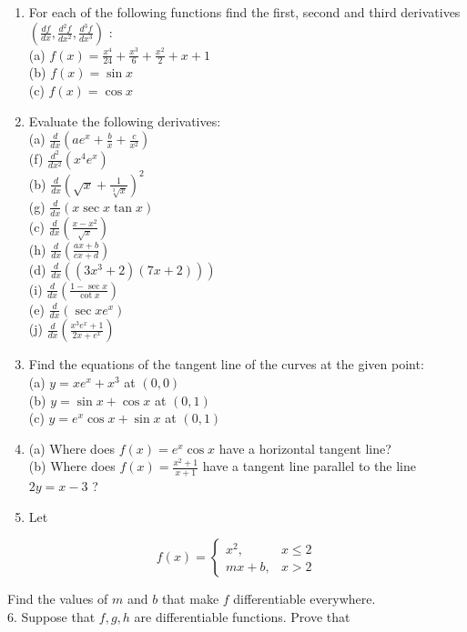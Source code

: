 \documentclass[10pt]{article}
\begin{document}
\begin{enumerate}
  \item For each of the following functions find the first, second and third derivatives $\left(\frac{d f}{d x}, \frac{d^{2} f}{d x^{2}}, \frac{d^{3} f}{d x^{3}}\right)$ :\\
(a) $f(x)=\frac{x^{4}}{24}+\frac{x^{3}}{6}+\frac{x^{2}}{2}+x+1$\\
(b) $f(x)=\sin x$\\
(c) $f(x)=\cos x$
  \item Evaluate the following derivatives:\\
(a) $\frac{d}{d x}\left(a e^{x}+\frac{b}{x}+\frac{c}{x^{2}}\right)$\\
(f) $\frac{d^{2}}{d x^{2}}\left(x^{4} e^{x}\right)$\\
(b) $\frac{d}{d x}\left(\sqrt{x}+\frac{1}{\sqrt[3]{x}}\right)^{2}$\\
(g) $\frac{d}{d x}(x \sec x \tan x)$\\
(c) $\frac{d}{d x}\left(\frac{x-x^{2}}{\sqrt{x}}\right)$\\
(h) $\frac{d}{d x}\left(\frac{a x+b}{c x+d}\right)$\\
(d) $\left.\frac{d}{d x}\left(\left(3 x^{3}+2\right)(7 x+2)\right)\right)$\\
(i) $\frac{d}{d x}\left(\frac{1-\sec x}{\cot x}\right)$\\
(e) $\frac{d}{d x}\left(\sec x e^{x}\right)$\\
(j) $\frac{d}{d x}\left(\frac{x^{3} e^{x}+1}{2 x+e^{x}}\right)$
  \item Find the equations of the tangent line of the curves at the given point:\\
(a) $y=x e^{x}+x^{3}$ at $(0,0)$\\
(b) $y=\sin x+\cos x$ at $(0,1)$\\
(c) $y=e^{x} \cos x+\sin x$ at $(0,1)$
  \item (a) Where does $f(x)=e^{x} \cos x$ have a horizontal tangent line?\\
(b) Where does $f(x)=\frac{x^{2}+1}{x+1}$ have a tangent line parallel to the line $2 y=x-3$ ?
  \item Let
\end{enumerate}

$$
f(x)= \begin{cases}x^{2}, & x \leq 2 \\ m x+b, & x>2\end{cases}
$$

Find the values of $m$ and $b$ that make $f$ differentiable everywhere.\\
6. Suppose that $f, g, h$ are differentiable functions. Prove that
\end{document}
